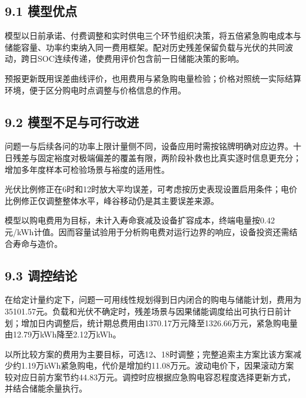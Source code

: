 \documentclass[UTF8,a4paper,zihao=-4,fontset=windows]{ctexart}
\begin{document}
\subsection{9.1 模型优点}
模型以日前承诺、付费调整和实时供电三个环节组织决策，将五倍紧急购电成本与储能容量、功率约束纳入同一费用框架。配对历史残差保留负载与光伏的共同波动，跨日SOC连续传递，使费用评价包含前一日储能决策的影响。
\par
预报更新既用误差曲线评价，也用费用与紧急购电量检验；价格对照统一实际结算环境，便于区分购电时点调整与价格信息的作用。
\par
\subsection{9.2 模型不足与可行改进}
问题一与后续各问的功率上限计量侧不同，设备应用时需按铭牌明确对应边界。十日残差与固定裕度对极端偏差的覆盖有限，两阶段补救也比真实逐时信息更充分；增加多年度样本可检验场景与裕度的适用性。
\par
光伏比例修正在6时和12时放大平均误差，可考虑按历史表现设置启用条件；电价比例修正仅调整整体水平，峰谷移动仍是其主要误差来源。
\par
模型以购电费用为目标，未计入寿命衰减及设备扩容成本，终端电量按0.42元/kWh计值。因而容量试验用于分析购电费对运行边界的响应，设备投资还需结合寿命与造价。
\par
\subsection{9.3 调控结论}
在给定计量约定下，问题一可用线性规划得到日内闭合的购电与储能计划，费用为35101.57元。负载和光伏不确定时，残差场景与因果储能调度给出可执行日前计划；增加日内调整后，统计期总费用由1370.17万元降至1326.66万元，紧急购电量由12.79万kWh降至2.12万kWh。
\par
{}
以所比较方案的费用为主要目标，可选12、18时调整；完整追索主方案比该方案减少约1.19万kWh紧急购电，代价是增加约11.08万元。波动电价下，因果滚动方案较对应日前方案节约44.83万元。调控时应根据应急购电容忍程度选择更新方式，并结合储能余量执行。
\par
\end{document}
